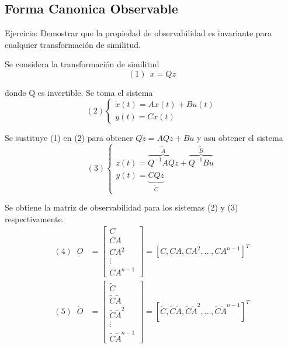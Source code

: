 \subsection{Forma Canonica Observable}
Ejercicio: Demostrar que la propiedad de observabilidad es invariante para cualquier transformación de similitud.

Se considera la transformación de similitud
\[
    (1)\:\:
    x = Qz
\]

donde Q es invertible. Se toma el sistema
\[
    (2)
    \left\{
        \begin{array}{lll}
            \dot{x}(t) = Ax(t) + Bu(t)\\
            y(t) = Cx(t)
        \end{array}
    \right.
\]

Se sustituye (1) en (2) para obtener \( Q\dot{z} = AQz+Bu \) y asu obtener el sistema
\[
    (3)
    \left\{
        \begin{array}{lll}
            \dot{z}(t) =
                \overbrace{Q^{-1}AQz}^{\tilde{A}}+ 
                \overbrace{Q^{-1}Bu}^{\tilde{B}}\\
            y(t) = \underbrace{
                CQz
            }_{\tilde{C}}
        \end{array}
    \right.
\]

Se obtiene la matriz de observabilidad para los sistemas (2) y (3) respectivamente.
\[
    \begin{split}
        (4)\;\;
        O & =\left[
        \begin{array}{cc}
            C \\
            CA \\
            CA^{2} \\
            \vdots \\
            CA^{n-1}
        \end{array}\right]
        =[C, CA, CA^{2}, \ldots, CA^{n-1}]^{T}
        \\
        (5)\;\;
        \tilde{O} & = \left[
        \begin{array}{cc}
            \tilde{C} \\
            \tilde{C}\tilde{A} \\
            \tilde{C}\tilde{A}^{2} \\
            \vdots \\
            \tilde{C}\tilde{A}^{n-1}
        \end{array}\right]
        =[\tilde{C}, \tilde{C}\tilde{A}, \tilde{C}\tilde{A}^{2}, \ldots, \tilde{C}\tilde{A}^{n-1}]^{T}
    \end{split}
\]

